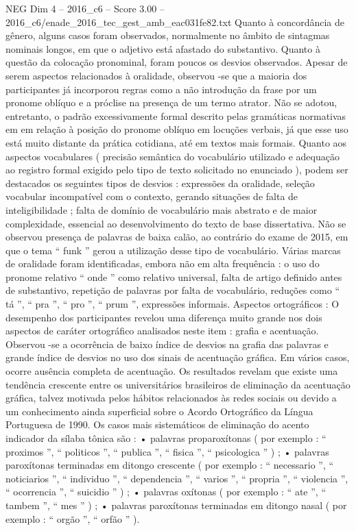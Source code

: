 \begin{textsample}{NEG Dim 4 – 2016\_c6 – Score 3.00 – 2016\_c6/enade\_2016\_tec\_gest\_amb\_eac031fe82.txt}
Quanto à concordância de gênero, alguns casos foram observados, normalmente no âmbito de sintagmas nominais longos, em que o adjetivo está afastado do substantivo.
Quanto à questão da colocação pronominal, foram poucos os desvios observados.
Apesar de serem aspectos relacionados à oralidade, observou -se que a maioria dos participantes já incorporou regras como a não introdução da frase por um pronome oblíquo e a próclise na presença de um termo atrator.
Não se adotou, entretanto, o padrão excessivamente formal descrito pelas gramáticas normativas em em relação à posição do pronome oblíquo em locuções verbais, já que esse uso está muito distante da prática cotidiana, até em textos mais formais.
Quanto aos aspectos vocabulares ( precisão semântica do vocabulário utilizado e adequação ao registro formal exigido pelo tipo de texto solicitado no enunciado ), podem ser destacados os seguintes tipos de desvios : expressões da oralidade, seleção vocabular incompatível com o contexto, gerando situações de falta de inteligibilidade ; falta de domínio de vocabulário mais abstrato e de maior complexidade, essencial ao desenvolvimento do texto de base dissertativa.
Não se observou presença de palavras de baixa calão, ao contrário do exame de 2015, em que o tema “ funk ” gerou a utilização desse tipo de vocabulário.
Várias marcas de oralidade foram identificadas, embora não em alta frequência : o uso do pronome relativo “ onde ” como relativo universal, falta de artigo definido antes de substantivo, repetição de palavras por falta de vocabulário, reduções como “ tá ”, “ pra ”, “ pro ”, “ prum ”, expressões informais.
Aspectos ortográficos : O desempenho dos participantes revelou uma diferença muito grande nos dois aspectos de caráter ortográfico analisados neste item : grafia e acentuação.
Observou -se a ocorrência de baixo índice de desvios na grafia das palavras e grande índice de desvios no uso dos sinais de acentuação gráfica.
Em vários casos, ocorre ausência completa de acentuação.
Os resultados revelam que existe uma tendência crescente entre os universitários brasileiros de eliminação da acentuação gráfica, talvez motivada pelos hábitos relacionados às redes sociais ou devido a um conhecimento ainda superficial sobre o Acordo Ortográfico da Língua Portuguesa de 1990.
Os casos mais sistemáticos de eliminação do acento indicador da sílaba tônica são : • palavras proparoxítonas ( por exemplo : “ proximos ”, “ politicos ”, “ publica ”, “ fisica ”, “ psicologica ” ) ; • palavras paroxítonas terminadas em ditongo crescente ( por exemplo : “ necessario ”, “ noticiarios ”, “ individuo ”, “ dependencia ”, “ varios ”, “ propria ”, “ violencia ”, “ ocorrencia ”, “ suicidio ” ) ; • palavras oxítonas ( por exemplo : “ ate ”, “ tambem ”, “ mes ” ) ; • palavras paroxítonas terminadas em ditongo nasal ( por exemplo : “ orgão ”, “ orfão ” ).

\end{textsample}
